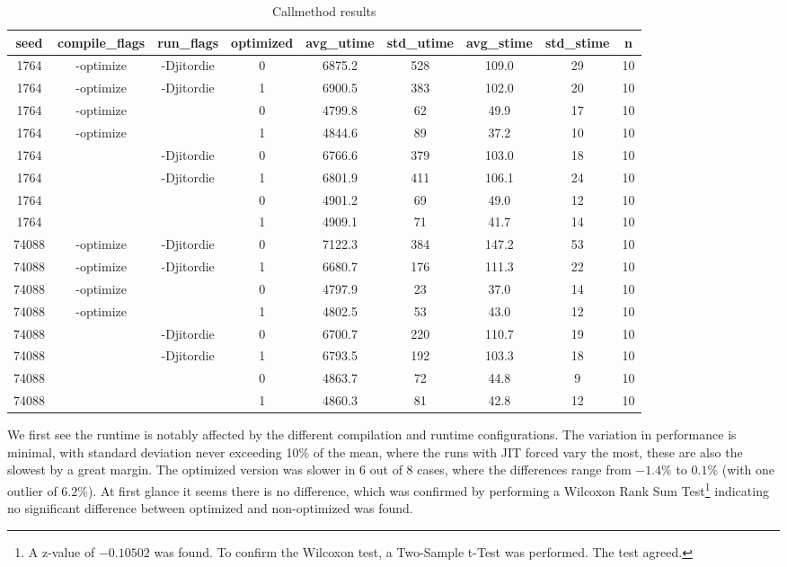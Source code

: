 \documentclass[a4paper,11pt]{scrartcl}
\begin{document}
\begin{table}[h!]
\begin{center}
\begin{tabular}{c|c|c|c|c|c|c|c|c|}
seed & compile\_flags & run\_flags & optimized & avg\_utime & std\_utime & avg\_stime & std\_stime & n \\
\hline
1764 & -optimize & -Djitordie & 0 & 6875.2 & 528 & 109.0 & 29 & 10 \\
1764 & -optimize & -Djitordie & 1 & 6900.5 & 383 & 102.0 & 20 & 10 \\
1764 & -optimize &  & 0 & 4799.8 & 62 & 49.9 & 17 & 10 \\
1764 & -optimize &  & 1 & 4844.6 & 89 & 37.2 & 10 & 10 \\
1764 &  & -Djitordie & 0 & 6766.6 & 379 & 103.0 & 18 & 10 \\
1764 &  & -Djitordie & 1 & 6801.9 & 411 & 106.1 & 24 & 10 \\
1764 &  &  & 0 & 4901.2 & 69 & 49.0 & 12 & 10 \\
1764 &  &  & 1 & 4909.1 & 71 & 41.7 & 14 & 10 \\
74088 & -optimize & -Djitordie & 0 & 7122.3 & 384 & 147.2 & 53 & 10 \\
74088 & -optimize & -Djitordie & 1 & 6680.7 & 176 & 111.3 & 22 & 10 \\
74088 & -optimize &  & 0 & 4797.9 & 23 & 37.0 & 14 & 10 \\
74088 & -optimize &  & 1 & 4802.5 & 53 & 43.0 & 12 & 10 \\
74088 &  & -Djitordie & 0 & 6700.7 & 220 & 110.7 & 19 & 10 \\
74088 &  & -Djitordie & 1 & 6793.5 & 192 & 103.3 & 18 & 10 \\
74088 &  &  & 0 & 4863.7 & 72 & 44.8 & 9 & 10 \\
74088 &  &  & 1 & 4860.3 & 81 & 42.8 & 12 & 10 \\

\end{tabular}
\end{center}
\caption{Callmethod results}
\label{tbl:callmethod-results}
\end{table}

We first see the runtime is notably affected by the different compilation and runtime configurations. The variation in performance is minimal, with standard deviation never exceeding 10\% of the mean, where the runs with JIT forced vary the most, these are also the slowest by a great margin. The optimized version was slower in 6 out of 8 cases, where the differences range from $-1.4$\% to $0.1$\% (with one outlier of $6.2$\%). At first glance it seems there is no difference, which was confirmed by performing a Wilcoxon Rank Sum Test\footnote{A z-value of $-0.10502$ was found. To confirm the Wilcoxon test, a Two-Sample t-Test was performed. The test agreed.} indicating no significant difference between optimized and non-optimized was found.
\end{document}
